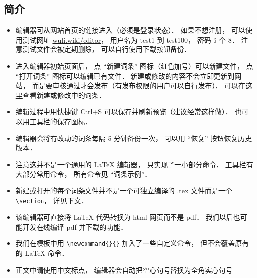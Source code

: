 
\subsection{简介}
\begin{itemize}
\item 编辑器可从网站首页的链接进入（必须是登录状态）． 如果不想注册， 可以使用测试网址 \href{http://wuli.wiki/editor}{wuli.wiki/editor}， 用户名为 test1 到 test100， 密码 6 个 8． 注意测试文件会被定期删除， 可以自行使用下载按钮备份．
\item 进入编辑器初始页面后， 点 “新建词条” 图标（红色加号）可以新建文件， 点 “打开词条” 图标可以编辑已有文件． 新建或修改的内容不会立即更新到网站， 而是要审核通过才会发布（有发布权限的用户可以自行发布）． 可以在\href{http://wuli.wiki/changed/changed.html}{这里}查看新建或修改中的词条．
\item 编辑过程中用快捷键 Ctrl+S 可以保存并刷新预览（建议经常这样做）． 也可以用工具栏的保存图标．
\item 编辑器会将有改动的词条每隔 5 分钟备份一次， 可以用 “恢复” 按钮恢复历史版本．
\item 注意这并不是一个通用的 LaTeX 编辑器， 只实现了一小部分命令． 工具栏有大部分常用命令， 所有命令见 “词条示例”．
\item 新建或打开的每个词条文件并不是一个可独立编译的 .tex 文件而是一个 \lstinline|\section|， 详见下文．
\item 该编辑器可直接将 LaTeX 代码转换为 html 网页而不是 pdf． 我们以后也可能开发在线编译 pdf 并下载的功能．
\item 我们在模板中用 \lstinline|\newcommand{}{}| 加入了一些自定义命令， 但不会覆盖原有的 LaTeX 命令．
\item 正文中请使用中文标点， 编辑器会自动把空心句号替换为全角实心句号
\end{itemize}


